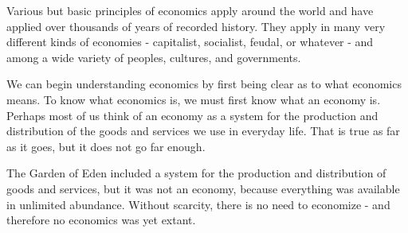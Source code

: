 Various but basic principles of economics apply around the world and have applied over thousands of years of recorded history. They apply in many very different kinds of economies - capitalist, socialist, feudal, or whatever - and among a wide variety of peoples, cultures, and governments. 

We can begin understanding economics by first being clear as to what economics means. To know what economics is, we must first know what an economy is. Perhaps most of us think of an economy as a system for the production and distribution of the goods and services we use in everyday life. That is true as far as it goes, but it does not go far enough.

The Garden of Eden included a system for the production and distribution of goods and services, but it was not an economy, because everything was available in unlimited abundance. Without scarcity, there is no need to economize - and therefore no economics was yet extant.